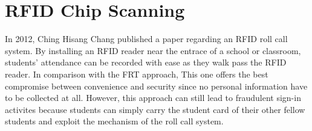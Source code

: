 \section{RFID Chip Scanning}
In 2012, Ching Hisang Chang published a paper regarding an RFID roll call system.
By installing an RFID reader near the entrace of a school or classroom, students' attendance
can be recorded with ease as they walk pass the RFID reader. In comparison with the FRT approach,
This one offers the best compromise between convenience and security since no personal information
have to be collected at all. However, this approach can still lead to fraudulent sign-in activites
because students can simply carry the student card of their other fellow students and
exploit the mechanism of the roll call system.
